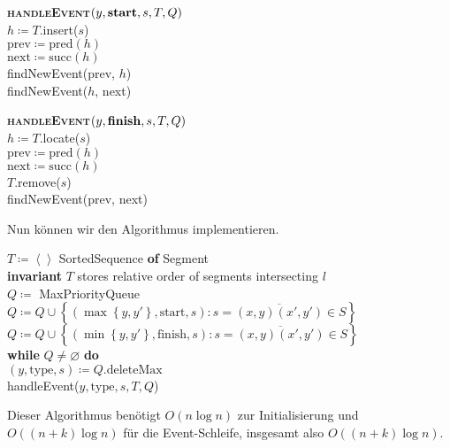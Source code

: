 \begin{minipage}{.475\textwidth}
  \vspace*{1em}
  \begin{pseudocode}
    \textbf{\textsc{handleEvent}}\( (y, \text{\textbf{start}}, s, T, Q) \) \\
    \( h \coloneqq T \).insert(\( s \)) \\
    \( \text{prev} \coloneqq \text{pred}(h) \) \\
    \( \text{next} \coloneqq \text{succ}(h) \) \\
    findNewEvent(prev, \( h \)) \\
    findNewEvent(\( h \), next)
  \end{pseudocode}
  \vspace*{1em}
\end{minipage}
\hfill
\begin{minipage}{.475\textwidth}
  \vspace*{1em}
  \begin{pseudocode}
    \textbf{\textsc{handleEvent}}\( (y, \text{\textbf{finish}}, s, T, Q) \) \\
    \( h \coloneqq T \).locate(\( s \)) \\
    \( \text{prev} \coloneqq \text{pred}(h) \) \\
    \( \text{next} \coloneqq \text{succ}(h) \) \\
    \( T \).remove(\( s \)) \\
    findNewEvent(prev, next)
  \end{pseudocode}
  \vspace*{1em}
\end{minipage}

Nun können wir den Algorithmus implementieren.

\begin{pseudocode}
  \( T \coloneqq \left\langle  \right\rangle \) SortedSequence \textbf{of} Segment \\
  \textbf{invariant} \( T \) stores relative order of segments intersecting \( l \) \\
  \( Q \coloneqq \) MaxPriorityQueue \\
  \( Q \coloneqq Q \cup \left \{ \left( \max\left \{ y,y' \right \}, \text{start}, s \right) : s = \overline{(x,y)(x',y')} \in S \right \} \) \\
  \( Q \coloneqq Q \cup \left \{ \left( \min\left \{ y,y' \right \}, \text{finish}, s \right) : s = \overline{(x,y)(x',y')} \in S \right \} \) \\
  \textbf{while} \( Q \neq \varnothing \) \textbf{do} \\
  \phantom{\enskip} \( (y,\text{type},s) \coloneqq Q \text{.deleteMax} \) \\
  \phantom{\enskip} handleEvent(\( y,\text{type},s,T,Q \))
\end{pseudocode}

Dieser Algorithmus benötigt \( O(n\log n) \) zur Initialisierung und \( O((n+k)\log n) \) für die Event-Schleife, insgesamt also \( O((n+k)\log n) \).